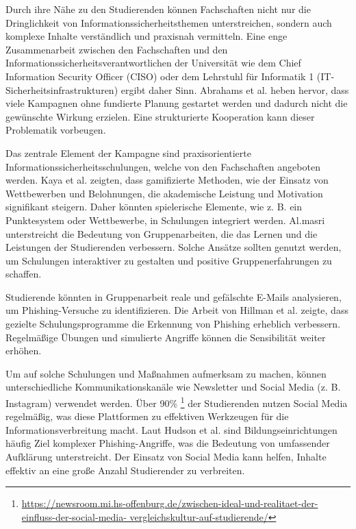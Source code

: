 \documentclass[german,report]{i1thesis}
\begin{document}
Durch ihre Nähe zu den Studierenden können Fachschaften nicht nur die Dringlichkeit von Informationssicherheitsthemen unterstreichen, sondern auch komplexe Inhalte verständlich und praxisnah vermitteln. Eine enge Zusammenarbeit zwischen den Fachschaften und den Informationssicherheitsverantwortlichen der Universität wie dem Chief Information Security Officer (CISO) oder dem Lehrstuhl für Informatik 1 (IT-Sicherheitsinfrastrukturen) ergibt daher Sinn. Abrahams et al. \cite{abrahams2024cybersecurity} heben hervor, dass viele Kampagnen ohne fundierte Planung gestartet werden und dadurch nicht die gewünschte Wirkung erzielen. Eine strukturierte Kooperation kann dieser Problematik vorbeugen.

Das zentrale Element der Kampagne sind praxisorientierte Informationssicherheitsschulungen, welche von den Fachschaften angeboten werden. Kaya et al. \cite{kaya2023impact} zeigten, dass gamifizierte Methoden, wie der Einsatz von Wettbewerben und Belohnungen, die akademische Leistung und Motivation signifikant steigern. Daher könnten spielerische Elemente, wie z. B. ein Punktesystem oder Wettbewerbe, in Schulungen integriert werden. Al.masri \cite{almasri2018groupwork} unterstreicht die Bedeutung von Gruppenarbeiten, die das Lernen und die Leistungen der Studierenden verbessern. Solche Ansätze sollten genutzt werden, um Schulungen interaktiver zu gestalten und positive Gruppenerfahrungen zu schaffen.

Studierende könnten in Gruppenarbeit reale und gefälschte E-Mails analysieren, um Phishing-Versuche zu identifizieren. Die Arbeit von Hillman et al. \cite{hillman2023evaluating} zeigte, dass gezielte Schulungsprogramme die Erkennung von Phishing erheblich verbessern. Regelmäßige Übungen und simulierte Angriffe können die Sensibilität weiter erhöhen.

Um auf solche Schulungen und Maßnahmen aufmerksam zu machen, können unterschiedliche Kommunikationskanäle wie Newsletter und Social Media (z. B. Instagram) verwendet werden. Über 90\% \footnote{\href{}{https://newsroom.mi.hs-offenburg.de/zwischen-ideal-und-realitaet-der-einfluss-der-social-media-
vergleichskultur-auf-studierende/}} der Studierenden nutzen Social Media regelmäßig, was diese Plattformen zu effektiven Werkzeugen für die Informationsverbreitung macht. 
Laut Hudson et al. \cite{hudson2023phishing} sind Bildungseinrichtungen häufig Ziel komplexer Phishing-Angriffe, was die Bedeutung von umfassender Aufklärung unterstreicht. Der Einsatz von Social Media kann helfen, Inhalte effektiv an eine große Anzahl Studierender zu verbreiten.
\end{document}
